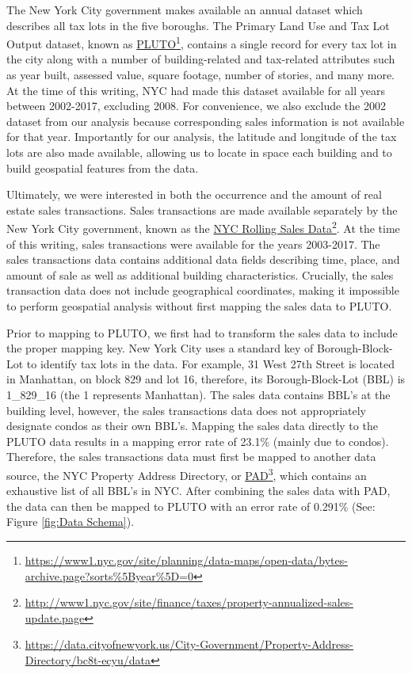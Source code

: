 \documentclass[12pt,]{article}
\let\rmarkdownfootnote\footnote%
\def\footnote{\protect\rmarkdownfootnote}
\begin{document}
The New York City government makes available an annual dataset which
describes all tax lots in the five boroughs. The Primary Land Use and
Tax Lot Output dataset, known as
\href{https://www1.nyc.gov/site/planning/data-maps/open-data/bytes-archive.page?sorts\%5Byear\%5D=0}{PLUTO}\footnote{\url{https://www1.nyc.gov/site/planning/data-maps/open-data/bytes-archive.page?sorts\%5Byear\%5D=0}},
contains a single record for every tax lot in the city along with a
number of building-related and tax-related attributes such as year
built, assessed value, square footage, number of stories, and many more.
At the time of this writing, NYC had made this dataset available for all
years between 2002-2017, excluding 2008. For convenience, we also
exclude the 2002 dataset from our analysis because corresponding sales
information is not available for that year. Importantly for our
analysis, the latitude and longitude of the tax lots are also made
available, allowing us to locate in space each building and to build
geospatial features from the data.

Ultimately, we were interested in both the occurrence and the amount of
real estate sales transactions. Sales transactions are made available
separately by the New York City government, known as the
\href{http://www1.nyc.gov/site/finance/taxes/property-annualized-sales-update.page}{NYC
Rolling Sales Data}\footnote{\url{http://www1.nyc.gov/site/finance/taxes/property-annualized-sales-update.page}}.
At the time of this writing, sales transactions were available for the
years 2003-2017. The sales transactions data contains additional data
fields describing time, place, and amount of sale as well as additional
building characteristics. Crucially, the sales transaction data does not
include geographical coordinates, making it impossible to perform
geospatial analysis without first mapping the sales data to PLUTO.

Prior to mapping to PLUTO, we first had to transform the sales data to
include the proper mapping key. New York City uses a standard key of
Borough-Block-Lot to identify tax lots in the data. For example, 31 West
27th Street is located in Manhattan, on block 829 and lot 16, therefore,
its Borough-Block-Lot (BBL) is 1\_829\_16 (the 1 represents Manhattan).
The sales data contains BBL's at the building level, however, the sales
transactions data does not appropriately designate condos as their own
BBL's. Mapping the sales data directly to the PLUTO data results in a
mapping error rate of 23.1\% (mainly due to condos). Therefore, the
sales transactions data must first be mapped to another data source, the
NYC Property Address Directory, or
\href{https://data.cityofnewyork.us/City-Government/Property-Address-Directory/bc8t-ecyu/data}{PAD}\footnote{\url{https://data.cityofnewyork.us/City-Government/Property-Address-Directory/bc8t-ecyu/data}},
which contains an exhaustive list of all BBL's in NYC. After combining
the sales data with PAD, the data can then be mapped to PLUTO with an
error rate of 0.291\% (See: Figure \ref{fig:Data Schema}).
\end{document}
